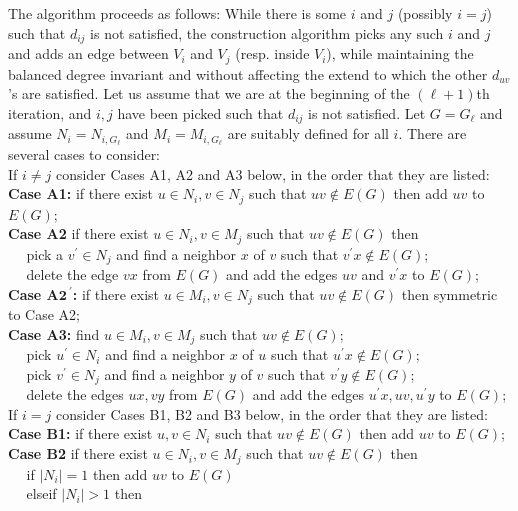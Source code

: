 \documentclass[12pt,a4paper]{article}
\theoremstyle{definition}
\theoremstyle{plain}
\begin{document}
The algorithm proceeds as follows: While there is some $i$ and $j$ (possibly $i=j$)
such that $d_{ij}$ is not satisfied,
the construction algorithm picks any such $i$ and $j$
and adds an edge between $V_i$ and $V_j$ (resp. inside $V_i$),
while maintaining the balanced degree invariant
and without affecting the extend to which the other $d_{uv}$'s
are satisfied.
Let us assume that we are at the beginning of the $({\ell}\! + \! 1)$th
iteration, and $i,j$ have been picked such that $d_{ij}$ is not satisfied.
Let $G = G_\ell$ and assume $N_i=N_{i,G_{\ell}}$ and $M_i=M_{i,G_{\ell}}$ are suitably defined for all $i$. 
There are several cases to consider:\smallskip \\
If $i \neq j$ consider Cases A1, A2 and A3 below, 
in the order that they are listed:\\
{\bf Case A1:} if there exist $u\in N_i, v\in N_j$
such that $uv \notin E(G)$ then add $uv$ to $E(G)$;\\
{\bf Case A2} if there exist $u\in N_i, v\in M_j$ 
such that $uv \notin E(G)$ then\\
$~~~~~~$pick a $v^{\prime} \in N_j$ and find a neighbor $x$ of $v$ 
such that $v^{\prime}x \notin E(G)$;\\
$~~~~~~$delete the edge $vx$ from $E(G)$
and add the edges $uv$ and $v^{\prime}x$ to $E(G)$;\\
{\bf Case A$\mathbf 2^{\:\prime}$:} if there exist $u\in M_i, v\in N_j$
such that $uv \notin E(G)$ then symmetric to Case A2;\\
{\bf Case A3:} find $u\in M_i, v\in M_j$ 
such that $uv \notin E(G)$;\\
$~~~~~~$pick $u^{\prime} \in N_i$ and find a neighbor $x$ of $u$ 
such that $u^{\prime}x \notin E(G)$;\\
$~~~~~~$pick $v^{\prime} \in N_j$ and find a neighbor $y$ of $v$
such that $v^{\prime}y \notin E(G)$;\\
$~~~~~~$delete the edges $ux,vy$ from $E(G)$ 
and add the edges $u^{\prime}x,uv,u^{\prime}y$ to $E(G)$;\smallskip\\
If $i = j$ consider Cases B1, B2 and B3 below,
in the order that they are listed:\\
{\bf Case B1:} if there exist $u , v\in N_i$
such that $uv \notin E(G)$ then add $uv$ to $E(G)$;\\
{\bf Case B2} if there exist $u\in N_i, v\in M_j$
such that $uv \notin E(G)$ then\\
$~~~~~~$if $|N_i|= 1$ then add $uv$ to $E(G)$\\
$~~~~~~$elseif $|N_i|>1$ then\\
\end{document}
